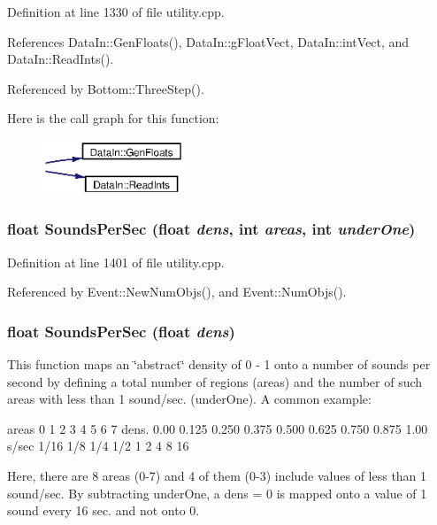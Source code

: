 Definition at line 1330 of file utility.cpp.

References Data\-In::Gen\-Floats(), Data\-In::g\-Float\-Vect, Data\-In::int\-Vect, and Data\-In::Read\-Ints().

Referenced by Bottom::Three\-Step().

Here is the call graph for this function:\begin{figure}[H]
\begin{center}
\leavevmode
\includegraphics[width=120pt]{utility_8cpp_a19_cgraph}
\end{center}
\end{figure}
\subsubsection{\setlength{\rightskip}{0pt plus 5cm}float Sounds\-Per\-Sec (float {\em dens}, int {\em areas}, int {\em under\-One})}\label{utility_8cpp_a22}




Definition at line 1401 of file utility.cpp.

Referenced by Event::New\-Num\-Objs(), and Event::Num\-Objs().
\subsubsection{\setlength{\rightskip}{0pt plus 5cm}float Sounds\-Per\-Sec (float {\em dens})}\label{utility_8cpp_a21}


This function maps an \char`\"{}abstract\char`\"{} density of 0 - 1 onto a number of sounds per second by defining a total number of regions (areas) and the number of such areas with less than 1 sound/sec. (under\-One). A common example:

areas 0 1 2 3 4 5 6 7 dens. 0.00 0.125 0.250 0.375 0.500 0.625 0.750 0.875 1.00 s/sec 1/16 1/8 1/4 1/2 1 2 4 8 16

Here, there are 8 areas (0-7) and 4 of them (0-3) include values of less than 1 sound/sec. By subtracting under\-One, a dens = 0 is mapped onto a value of 1 sound every 16 sec. and not onto 0.

